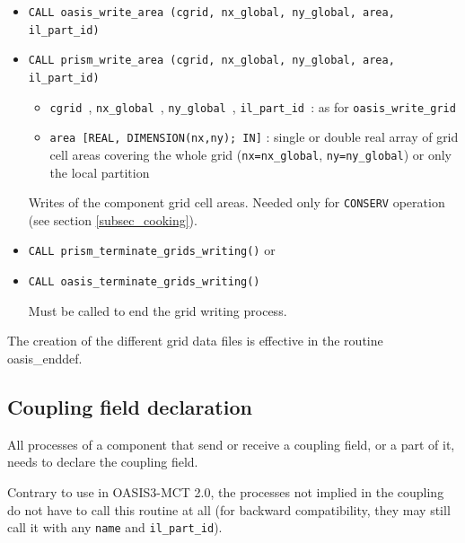 \begin{itemize}
  \vspace{0.2cm}
\item {\tt CALL oasis\_write\_area (cgrid, nx\_global, ny\_global, area, il\_part\_id)}
\item {\tt CALL prism\_write\_area (cgrid, nx\_global, ny\_global, area, il\_part\_id)}

  \begin{itemize}
  \item {\tt cgrid }, {\tt nx\_global }, {\tt ny\_global }, {\tt il\_part\_id }: as for {\tt oasis\_write\_grid}
  \item {\tt area [REAL, DIMENSION(nx,ny); IN]} : single or double real array of grid cell
    areas covering the whole grid ({\tt nx=nx\_global}, {\tt ny=ny\_global}) or only the local partition 
  \end{itemize}
  Writes of the component grid cell areas. Needed only for {\tt CONSERV}
  operation (see section \ref{subsec_cooking}).

  \vspace{0.2cm}
\item {\tt CALL prism\_terminate\_grids\_writing()} or
\item {\tt CALL oasis\_terminate\_grids\_writing()}

Must be called to end the grid writing process.

\end{itemize}

The creation of the different grid data files is effective in the routine
oasis\_enddef.

\subsection{Coupling field declaration}
\label{subsubsec_Declaration}

All processes of a component that send or receive a coupling field, or a part of it, needs to declare the coupling field.
 
Contrary to use in OASIS3-MCT 2.0, the processes not implied in the
coupling do not have to call this routine at all (for backward
compatibility, they may still call it with any {\tt name} and {\tt il\_part\_id}).

